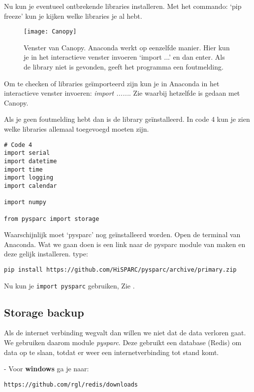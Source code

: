 Nu kun je eventueel ontbrekende libraries installeren. Met het commando:
`pip freeze' kun je kijken welke libraries je al hebt.

\begin{figure}
    \centering
    \texttt{[image: Canopy]}
    \caption{Venster van Canopy. Anaconda werkt op eenzelfde manier. Hier kun je
    in het interactieve venster invoeren `import ...' en dan enter. Als de library
    niet is gevonden, geeft het programma een foutmelding.}
    \label{fig:canopy1}
\end{figure}

Om te checken of libraries geïmporteerd zijn kun je in Anaconda in het
interactieve venster invoeren: \emph{import ......}. Zie
 waarbij hetzelfde is gedaan met Canopy.

Als je geen foutmelding hebt dan is de library geïnstalleerd.
In code 4 kun je zien welke libraries allemaal toegevoegd moeten zijn.

\begin{verbatim}
# Code 4
import serial
import datetime
import time
import logging
import calendar

import numpy

from pysparc import storage
\end{verbatim}

Waarschijnlijk moet `pysparc' nog geïnstalleerd worden. Open de terminal van
Anaconda. Wat we gaan doen is een link naar de pysparc module van \hisparc
maken en deze gelijk installeren. type:
\begin{verbatim}
pip install https://github.com/HiSPARC/pysparc/archive/primary.zip
\end{verbatim}

Nu kun je \verb|import pysparc| gebruiken, Zie .


\subsection{Storage backup}

Als de internet verbinding wegvalt dan willen we niet dat de data verloren gaat.
We gebruiken daarom module \emph{pysparc}. Deze gebruikt een database (Redis) om data
op te slaan, totdat er weer een internetverbinding tot stand komt.

- Voor \textbf{windows} ga je naar:
\begin{verbatim}
https://github.com/rgl/redis/downloads
\end{verbatim}

